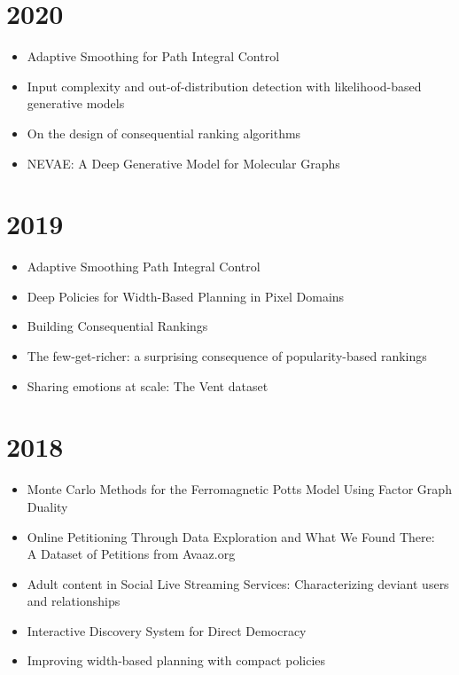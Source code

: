 \documentclass{article}
\begin{document}
\section*{2020}
\begin{itemize}
\item Adaptive Smoothing for Path Integral Control~\cite{JMLR:v21:18-624}
\item Input complexity and out-of-distribution detection with likelihood-based generative models~\cite{serra2020}
\item On the design of consequential ranking algorithms~\cite{pmlr-v124-tabibian20a}
\item NEVAE: A Deep Generative Model for Molecular Graphs~\cite{JMLR:v21:19-671}
\end{itemize}
\section*{2019}
\begin{itemize}
\item Adaptive Smoothing Path Integral Control~\cite{thalmeier2019}
\item Deep Policies for Width-Based Planning in Pixel Domains~\cite{junyent2019}
\item Building Consequential Rankings~\cite{Tabibian2019}
\item The few-get-richer: a surprising consequence of popularity-based rankings~\cite{fewgetricher2019}
\item Sharing emotions at scale: The Vent dataset~\cite{vent}
\end{itemize}
\section*{2018}
\begin{itemize}
\item Monte Carlo Methods for the Ferromagnetic Potts Model Using Factor Graph Duality~\cite{dual_potts}
\item Online Petitioning Through Data Exploration and What We Found There:\\ A Dataset of Petitions from Avaaz.org~\cite{icwsm2018}
\item Adult content in Social Live Streaming Services: Characterizing deviant users and relationships~\cite{lykousas2018adult}
\item Interactive Discovery System for Direct Democracy~\cite{aragon2018interactive}
\item Improving width-based planning with compact policies~\cite{junyentPAL18}
\end{itemize}
\end{document}

